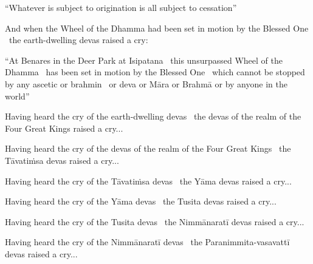 \begin{english-only-hang}
  ``Whatever is subject to origination is all subject to cessation''
\end{english-only-hang}

\begin{english-only-hang}
  And when the Wheel of the Dhamma had been set in motion by the Blessed One \breathmark\ the earth-dwelling devas raised a cry:
\end{english-only-hang}

\begin{english-only-hang}
  ``At Benares in the Deer Park at Isipatana \breathmark\ this unsurpassed Wheel of the Dhamma \breathmark\ has been set in motion by the Blessed One \breathmark\ which cannot be stopped by any ascetic or brahmin \breathmark\ or deva or Māra or Brahmā or by anyone in the world''
\end{english-only-hang}

\begin{english-only-hang}
  Having heard the cry of the earth-dwelling devas \breathmark\ the devas of the realm of the Four Great Kings raised a cry...
\end{english-only-hang}

\begin{english-only-hang}
  Having heard the cry of the devas of the realm of the Four Great Kings \breathmark\ the Tāvatiṁsa devas raised a cry...
\end{english-only-hang}

\begin{english-only-hang}
  Having heard the cry of the Tāvatiṁsa devas \breathmark\ the Yāma devas raised a cry...
\end{english-only-hang}

\begin{english-only-hang}
  Having heard the cry of the Yāma devas \breathmark\ the Tusita devas raised a cry...
\end{english-only-hang}

\begin{english-only-hang}
  Having heard the cry of the Tusita devas \breathmark\ the Nimmānaratī devas raised a cry...
\end{english-only-hang}
\begin{english-only-hang}
  Having heard the cry of the Nimmānaratī devas \breathmark\ the Paranimmita-vasavattī devas raised a cry...
\end{english-only-hang}

